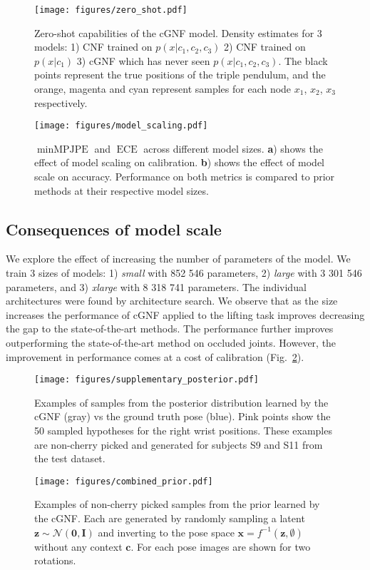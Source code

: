 \documentclass{article} \usepackage{iclr2023_conference,times}
\def\vz{{\bm{z}}}
\begin{document}
\begin{figure}[t]
\centering
\texttt{[image: figures/zero\_shot.pdf]}
\caption{Zero-shot capabilities of the cGNF model. Density estimates for 3 models: 1) CNF trained on $p(x | c_1, c_2, c_3)$ 2) CNF trained on $p(x | c_1)$ 3) cGNF which has never seen $p(x | c_1, c_2, c_3)$. The black points represent the true positions of the triple pendulum, and the orange, magenta and cyan represent samples for each node $x_1$, $x_2$, $x_3$ respectively.}
\label{fig:fig4}
\end{figure}

\begin{figure}[h]
\centering
\texttt{[image: figures/model\_scaling.pdf]}
\caption{$\operatorname{minMPJPE}$ and $\operatorname{ECE}$ across different model sizes. \textbf{a}) shows the effect of model scaling on calibration. \textbf{b}) shows the effect of model scale on accuracy. Performance on both metrics is compared to prior methods at their respective model sizes.
}
\label{fig:model_scaling}
\end{figure}
\subsection{Consequences of model scale}
\label{sec:app_model_scale}
We explore the effect of increasing the number of parameters of the model. We train 3 sizes of models: 1) \textit{small} with 852 546 parameters, 2) \textit{large} with 3 301 546 parameters, and 3) \textit{xlarge} with 8 318 741 parameters. The individual architectures were found by architecture search. We observe that as the size increases the performance of cGNF applied to the lifting task improves decreasing the gap to the state-of-the-art methods.
The performance further improves outperforming the state-of-the-art method on occluded joints.
However, the improvement in performance comes at a cost of calibration (Fig.~\ref{fig:model_scaling}).

\begin{figure}[t!]
\centering
\texttt{[image: figures/supplementary\_posterior.pdf]}
\caption{Examples of samples from the posterior distribution learned by the cGNF (gray) vs the ground truth pose (blue).
Pink points show the 50 sampled hypotheses for the right wrist positions.
These examples are non-cherry picked and generated for subjects S9 and S11 from the test dataset.}
\label{fig:supp_posterior}
\end{figure}

\begin{figure}[t!]
\centering
\texttt{[image: figures/combined\_prior.pdf]}
\caption{Examples of non-cherry picked samples from the prior learned by the cGNF. Each are generated by randomly sampling a latent $\vz \sim \mathcal{N}(\mathbf{0}, \mathbf{I})$ and inverting to the pose space $\mathbf{x} = f^{-1}(\vz, \emptyset)$ without any context $\mathbf{c}$.
For each pose images are shown for two rotations.
}
\label{fig:prior_samples}
\end{figure}
\end{document}
